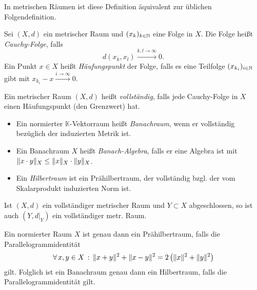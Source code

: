 \documentclass{cheat-sheet}
\newcommand{\K}{\mathbb{K}}
\newcommand{\convWith}[1]{\xrightarrow{#1 \to \infty}} %
\begin{document}
\begin{bem}
  In metrischen Räumen ist diese Definition äquivalent zur üblichen Folgendefinition.
\end{bem}

\begin{definition}
  Sei $(X, d)$ ein metrischer Raum und $(x_k)_{k \in \mathbb{N}}$ eine Folge in $X$. Die Folge heißt \emph{Cauchy-Folge}, falls
  \[ d(x_k, x_l) \convWith{k, l} 0. \]
  Ein Punkt $x \in X$ heißt \emph{Häufungspunkt} der Folge, falls es eine Teilfolge $(x_{k_i})_{i \in \mathbb{N}}$ gibt mit $x_{k_i} - x \convWith{i} 0$.
\end{definition}

\begin{definition}
  Ein metrischer Raum $(X, d)$ heißt \emph{vollständig}, falls jede Cauchy-Folge in $X$ einen Häufungspunkt (den Grenzwert) hat.
\end{definition}

\begin{definition}
  \begin{itemize}
    \item Ein normierter $\K$-Vektorraum heißt \emph{Banachraum}, wenn er vollständig bezüglich der induzierten Metrik ist.
    \item Ein Banachraum $X$ heißt \emph{Banach-Algebra}, falls er eine Algebra ist mit $\lVert x \cdot y\rVert_X \leq \lVert x\rVert_X \cdot \lVert y\rVert_X$.
    \item Ein \emph{Hilbertraum} ist ein Prähilbertraum, der vollständig bzgl. der vom Skalarprodukt induzierten Norm ist.
  \end{itemize}
\end{definition}

\begin{lem}
  Ist $(X, d)$ ein vollständiger metrischer Raum und $Y \subset X$ abgeschlossen, so ist auch $(Y, d|_Y)$ ein vollständiger metr. Raum.
\end{lem}


\begin{bem}
  Ein normierter Raum $X$ ist genau dann ein Prähilbertraum, falls die Parallelogrammidentität
  \[ \forall \, {x,y \in X} \,:\, \lVert x+y\rVert^2 + \lVert x-y\rVert^2 = 2 \left(\lVert x\rVert^2 + \lVert y\rVert^2\right) \]
  gilt. Folglich ist ein Banachraum genau dann ein Hilbertraum, falls die Parallelogrammidentität gilt.
\end{bem}

\end{document}
